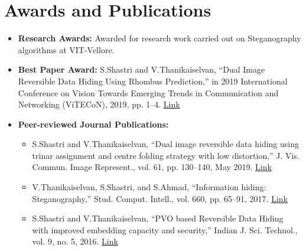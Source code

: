 \documentclass[a4paper,11pt]{article}
\begin{document}
\section{Awards and Publications}
	\begin{itemize}[leftmargin=*, itemsep = -4pt]
		\item \textbf{Research Awards: }{Awarded for research work carried out on Steganography algorithms at VIT-Vellore.}
		\item \textbf{Best Paper Award: }{S.Shastri and V.Thanikaiselvan, “Dual Image Reversible Data Hiding Using Rhombus Prediction,” in 2019 International Conference on Vision Towards Emerging Trends in Communication and Networking (ViTECoN), 2019, pp. 1–4. \href{https://doi.org/10.1109/ViTECoN.2019.8899667}{Link}}
		\item \textbf{Peer-reviewed Journal Publications:}
			\begin{itemize}[leftmargin=*, itemsep = -2pt, topsep = -4pt]
				\item{S.Shastri and V.Thanikaiselvan, “Dual image reversible data hiding using trinar assignment and centre folding strategy with low distortion,” J. Vis. Commun. Image Represent., vol. 61, pp. 130–140, May 2019. \href{https://doi.org/10.1016/j.jvcir.2019.03.022}{Link}}
				\item{V.Thanikaiselvan, S.Shastri, and S.Ahmad, “Information hiding: Steganography,” Stud. Comput. Intell., vol. 660, pp. 65–91, 2017. \href{https://doi.org/10.1007/978-3-319-44790-2\_4}{Link}}
				\item{S.Shastri and V.Thanikaiselvan, “PVO based Reversible Data Hiding with improved embedding capacity and security,” Indian J. Sci. Technol., vol. 9, no. 5, 2016. \href{https://dx.doi.org/10.17485/ijst/2016/v9i5/87191}{Link}}
			\end{itemize}
				
	\end{itemize}
			
\end{document}
